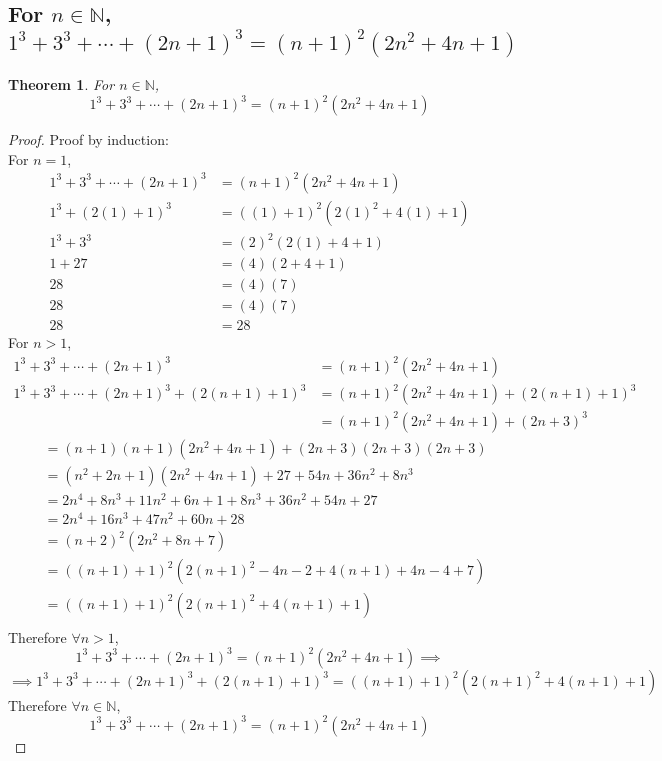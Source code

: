 \documentclass[]{article}
\newcommand{\N}{\mathbb{N}}
\newtheorem{theorem}{Theorem}
\begin{document}
\newpage
\subsection{For $n \in \N$,
    $1^3 + 3^3 + \cdots + (2n + 1)^3 = (n+1)^2 (2n^2 + 4n + 1)$
}
\begin{theorem}
    For $n \in \N$,
    $$1^3 + 3^3 + \cdots + (2n + 1)^3 = (n+1)^2 (2n^2 + 4n + 1)$$
\end{theorem}
\begin{proof}
    Proof by induction:\\
    For $n = 1$,
    \begin{align*}
        1^3 + 3^3 + \cdots + (2n + 1)^3 &= (n+1)^2 (2n^2 + 4n + 1)\\
        1^3 + (2(1) + 1)^3 &= ((1)+1)^2 (2(1)^2 + 4(1) + 1)\\
        1^3 + 3^3 &= (2)^2 (2(1) + 4 + 1)\\
        1 + 27 &= (4) (2 + 4 + 1)\\
        28 &= (4)(7)\\
        28 &= (4)(7)\\
        28 &= 28
    \end{align*}
    For $n > 1$,
    \begin{align*}
        1^3 + 3^3 + \cdots + (2n + 1)^3 &= (n+1)^2 (2n^2 + 4n + 1)\\
        1^3 + 3^3 + \cdots + (2n + 1)^3 + (2(n+1)+1)^3
            &= (n+1)^2 (2n^2 + 4n + 1) + (2(n+1)+1)^3\\
            &= (n+1)^2 (2n^2 + 4n + 1) + (2n + 3)^3
    \end{align*}
    \begin{align*}
        &= (n+1)(n+1) (2n^2 + 4n + 1) + (2n + 3)(2n + 3)(2n + 3)\\
        &= (n^2 + 2n + 1) (2n^2 + 4n + 1) + 27 + 54 n + 36 n^2 + 8 n^3\\
        &= 2n^4 + 8n^3 + 11n^2 + 6n + 1 + 8n^3 + 36 n^2 + 54n + 27\\
        &= 2n^4 + 16n^3 + 47n^2 + 60n + 28\\
        &= (n+2)^2(2n^2 + 8n + 7)\\
        &= ((n+1)+1)^2 (2(n+1)^2 - 4n - 2 + 4(n+1) + 4n - 4 + 7)\\
        &= ((n+1)+1)^2 (2(n+1)^2 + 4(n+1) + 1)\\
    \end{align*}
    Therefore $\forall n > 1$,
    $$
    1^3 + 3^3 + \cdots + (2n + 1)^3 = (n+1)^2 (2n^2 + 4n + 1)\implies
    $$
    $$\implies 1^3 + 3^3 + \cdots + (2n + 1)^3 + (2(n+1)+1)^3
    = ((n+1)+1)^2 (2(n+1)^2 + 4(n+1) + 1)
    $$
    Therefore $\forall n \in \N$,
    $$1^3 + 3^3 + \cdots + (2n + 1)^3 = (n+1)^2 (2n^2 + 4n + 1)$$
\end{proof}
\end{document}
